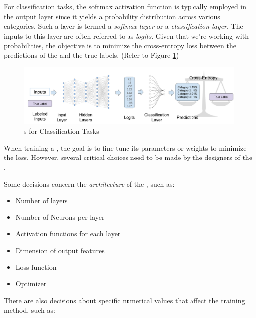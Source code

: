 For classification tasks, the \gls{softmax} activation function is typically employed in the output layer since it yields a probability distribution across various categories. Such a layer is termed a \emph{\gls{softmax} layer} or a \emph{classification layer}. The inputs to this layer are often referred to as \emph{logits}. Given that we're working with probabilities, the objective is to minimize the cross-entropy loss between the predictions of the \neuralNetwork{} and the true labels.
(Refer to Figure \ref{fig:02_nn_nns_for_classification})

\begin{figure}
    \centering
    \includegraphics[width=\textwidth]{Figures/02/02_nns_for_classification.png}
    \caption{\neuralNetwork{}s for Classification Tasks}
    \label{fig:02_nn_nns_for_classification}
\end{figure}



\label{02_nn_hyperparameters}

When training a \neuralNetwork{}, the goal is to fine-tune its parameters or weights to minimize the loss. However, several critical choices need to be made by the designers of the \neuralNetwork{}.

Some decisions concern the \emph{architecture} of the \neuralNetwork{}, such as:

\begin{itemize}
    \item Number of layers
    \item Number of Neurons per layer
    \item Activation functions for each layer
    \item Dimension of output features
    \item Loss function
    \item Optimizer
\end{itemize}

There are also decisions about specific numerical values that affect the training method, such as:


